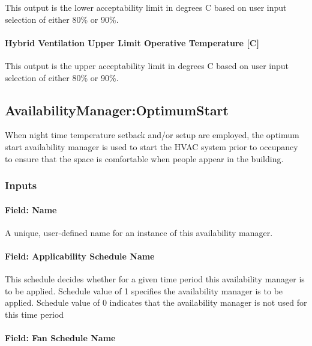 This output is the lower acceptability limit in degrees C based on user input selection of either 80\% or 90\%.

\paragraph{Hybrid Ventilation Upper Limit Operative Temperature {[C]}}\label{hybrid-ventilation-upper-limit-operative-temperature}

This output is the upper acceptability limit in degrees C based on user input selection of either 80\% or 90\%.

\subsection{AvailabilityManager:OptimumStart}\label{availabilitymanageroptimumstart}

When night time temperature setback and/or setup are employed, the optimum start availability manager is used to start the HVAC system prior to occupancy to ensure that the space is comfortable when people appear in the building.

\subsubsection{Inputs}\label{inputs-11-020}

\paragraph{Field: Name}\label{field-name-10-017}

A unique, user-defined name for an instance of this availability manager.

\paragraph{Field: Applicability Schedule Name}\label{field-applicability-schedule-name-2}

This schedule decides whether for a given time period this availability manager is to be applied. Schedule value of 1 specifies the availability manager is to be applied. Schedule value of 0 indicates that the availability manager is not used for this time period

\paragraph{Field: Fan Schedule Name}\label{field-fan-schedule-name-1}

